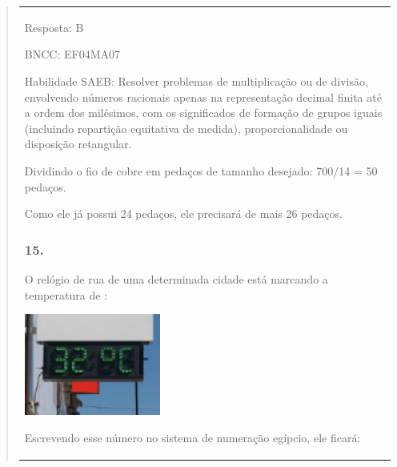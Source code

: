 \begin{enumerate}
\begin{escolha}
\begin{enumerate}
\begin{itemize}
\begin{itemize}
\begin{escolha}
\begin{quote}
\begin{escolha}
{\begin{longtable}[]{@{}l@{}}
\begin{itemize}
Resposta: B

BNCC: EF04MA07

Habilidade SAEB: Resolver problemas de multiplicação ou de divisão,
envolvendo números racionais apenas na representação decimal finita até
a ordem dos milésimos, com os significados de formação de grupos iguais
(incluindo repartição equitativa de medida), proporcionalidade ou
disposição retangular.

Dividindo o fio de cobre em pedaços de tamanho desejado: 700/14 = 50
pedaços.

Como ele já possui 24 pedaços, ele precisará de mais 26 pedaços.

\subsubsection{15.}\label{section-186}

O relógio de rua de uma determinada cidade está marcando a temperatura
de :

\includegraphics[width=1.75833in,height=1.31518in]{media/image162.png}

Escrevendo esse número no sistema de numeração egípcio, ele ficará:


\end{itemize}
\end{longtable}}
\end{escolha}
\end{quote}
\end{escolha}
\end{itemize}
\end{itemize}
\end{enumerate}
\end{escolha}
\end{enumerate}
